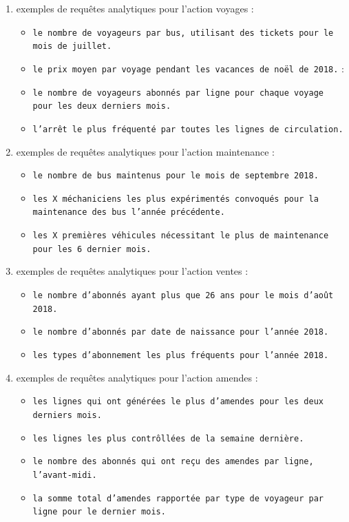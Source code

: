 \documentclass[a4paper,12pt]{report}
\begin{document}
\begin{enumerate}
  \item exemples de requêtes analytiques pour l'action \og voyages \fg :
  \begin{itemize}
    \item \texttt{le nombre de voyageurs par bus, utilisant des tickets pour le mois de juillet.}
    \item \texttt{le prix moyen par voyage pendant les vacances de noël de 2018.} :
    \item \texttt{le nombre de voyageurs abonnés par ligne pour chaque voyage pour les deux derniers mois.}
    \item \texttt{l'arrêt le plus fréquenté par toutes les lignes de circulation.}
  \end{itemize}
  \item exemples de requêtes analytiques pour l'action \og maintenance \fg :
  \begin{itemize}
    \item \texttt{le nombre de bus maintenus pour le mois de septembre 2018.}
    \item \texttt{les X méchaniciens les plus expérimentés convoqués pour la maintenance des bus l'année précédente.}
    \item \texttt{les X premières véhicules nécessitant le plus de maintenance pour les 6 dernier mois.}
  \end{itemize}
  \item exemples de requêtes analytiques pour l'action \og ventes \fg :
  \begin{itemize}
    \item \texttt{le nombre d'abonnés ayant plus que 26 ans pour le mois d'août 2018.}
    \item \texttt{le nombre d'abonnés par date de naissance pour l'année 2018.}
    \item \texttt{les types d'abonnement les plus fréquents pour l'année 2018.}
  \end{itemize}
  \item exemples de requêtes analytiques pour l'action \og amendes \fg :
  \begin{itemize}
    \item \texttt{les lignes qui ont générées le plus d'amendes pour les deux derniers mois.}
    \item \texttt{les lignes les plus contrôllées de la semaine dernière.}
    \item \texttt{le nombre des abonnés qui ont reçu des amendes par ligne, l'avant-midi.}
    \item \texttt{la somme total d'amendes rapportée par type de voyageur par ligne pour le dernier mois.}
  \end{itemize}
\end{enumerate}
\end{document}

